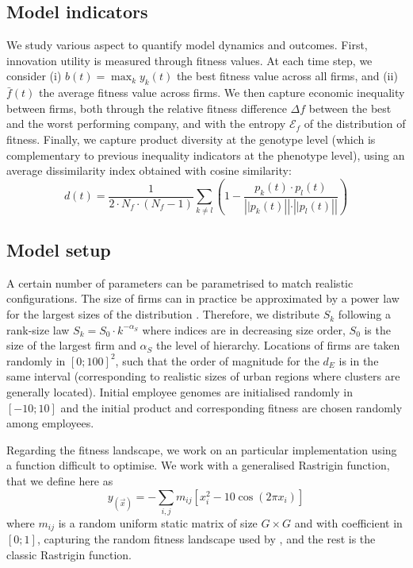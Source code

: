 \documentclass[letterpaper]{article}
\begin{document}
\subsection{Model indicators}

We study various aspect to quantify model dynamics and outcomes. First, innovation utility is measured through fitness values. At each time step, we consider (i) $b(t) = \max_k y_k (t)$ the best fitness value across all firms, and (ii) $\bar{f} (t)$ the average fitness value across firms. We then capture economic inequality between firms, both through the relative fitness difference $\Delta f$ between the best and the worst performing company, and with the entropy $\mathcal{E}_f$ of the distribution of fitness. Finally, we capture product diversity at the genotype level (which is complementary to previous inequality indicators at the phenotype level), using an average dissimilarity index obtained with cosine similarity:
\[
d(t) = \frac{1}{2 \cdot N_f \cdot (N_f - 1)} \sum_{k \neq l} \left(1 - \frac{p_k (t)\cdot p_l (t)}{\left||p_k (t)\right|| \cdot \left||p_l (t)\right||}\right)
\]


\subsection{Model setup}

A certain number of parameters can be parametrised to match realistic configurations. The size of firms can in practice be approximated by a power law for the largest sizes of the distribution \citep{growiec2008size}. Therefore, we distribute $S_k$ following a rank-size law $S_k = S_0 \cdot k^{-\alpha_S}$ where indices are in decreasing size order, $S_0$ is the size of the largest firm and $\alpha_S$ the level of hierarchy. Locations of firms are taken randomly in $\left[0 ; 100 \right]^2$, such that the order of magnitude for the $d_E$ is in the same interval (corresponding to realistic sizes of urban regions where clusters are generally located). Initial employee genomes are initialised randomly in $[-10 ; 10]$ and the initial product and corresponding fitness are chosen randomly among employees.

Regarding the fitness landscape, we work on an particular implementation using a function difficult to optimise. We work with a generalised Rastrigin function, that we define here as
\[
y_(\vec{x}) = - \sum_{i,j} m_{ij} \left[x_i^2 - 10 \cos\left(2 \pi x_i\right) \right]
\]
where $m_{ij}$ is a random uniform static matrix of size $G \times G$ and with coefficient in $[0;1]$, capturing the random fitness landscape used by  \cite{ma2005agent}, and the rest is the classic Rastrigin function.
\end{document}
